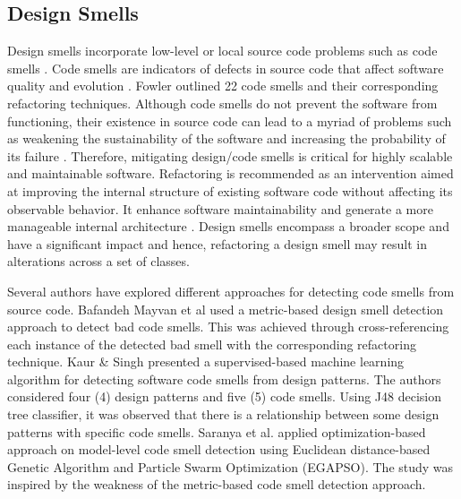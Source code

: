\documentclass[AMA,Times1COL]{WileyNJDv5} %
\begin{document}
\subsection{Design Smells}
Design smells incorporate low-level or local source code problems such as code smells \cite{vaucher2009tracking}. Code smells are indicators of defects in source code that affect software quality and evolution \cite{soh2016code, oizumi2018identification,abuhassan2021software}. Fowler \cite{1999:RID:311424} outlined 22 code smells and their corresponding refactoring techniques. Although code smells do not prevent the software from functioning, their existence in source code can lead to a myriad of problems such as weakening the sustainability of the software and increasing the probability of its failure \cite{turkistani2019reducing}. Therefore, mitigating design/code smells is critical for highly scalable and maintainable software. Refactoring is recommended as an intervention aimed at improving the internal structure of existing software code without affecting its observable behavior. It enhance software maintainability and generate a more manageable internal architecture \cite{turkistani2019reducing}. Design smells encompass a broader scope and have a significant impact and hence, refactoring a design smell may result in alterations across a set of classes\cite{sharma2020empirical}.

Several authors have explored different approaches for detecting code smells from source code. Bafandeh Mayvan et al \cite{bafandeh2020bad} used a metric-based design smell detection approach to detect bad code smells. This was achieved through cross-referencing each instance of the detected bad smell with the corresponding refactoring technique. Kaur \& Singh \cite{kaur2018detecting} presented a supervised-based machine learning algorithm for detecting software code smells from design patterns. The authors considered four (4) design patterns and five (5) code smells. Using J48 decision tree classifier, it was observed that there is a relationship between some design patterns with specific code smells. Saranya et al. \cite{saranya2018model} applied optimization-based approach on model-level code smell detection using Euclidean distance-based Genetic Algorithm and Particle Swarm Optimization (EGAPSO). The study was inspired by the weakness of the metric-based code smell detection approach.
\end{document}
